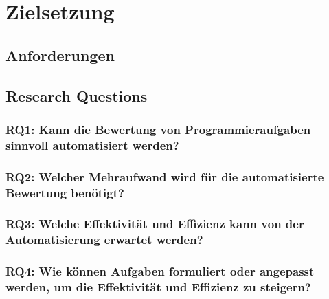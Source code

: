 \chapter{Zielsetzung}\label{ch:goals}

\section{Anforderungen}\label{sec:requirements}

\section{Research Questions}\label{sec:research-questions}

\subsection[RQ1]{RQ1: Kann die Bewertung von Programmieraufgaben sinnvoll automatisiert werden?}\label{subsec:rq1-useful-automation}

\subsection[RQ2]{RQ2: Welcher Mehraufwand wird für die automatisierte Bewertung benötigt?}\label{subsec:rq2-additional-effort}


\subsection[RQ3]{RQ3: Welche Effektivität und Effizienz kann von der Automatisierung erwartet werden?}\label{subsec:rq3-effectivity-efficiency}


\subsection[RQ4]{RQ4: Wie können Aufgaben formuliert oder angepasst werden, um die Effektivität und Effizienz zu steigern?}\label{subsec:rq4-improve-effectivity-efficiency}
